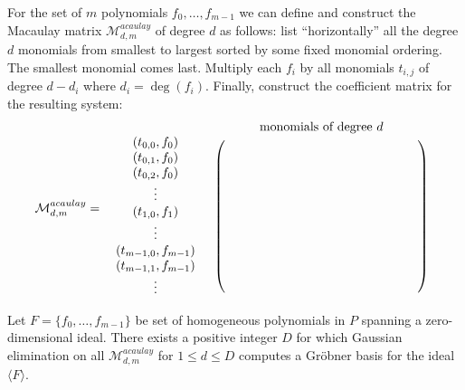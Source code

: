 \documentclass{llncs}
\newcommand{\ideal}[1]{\ensuremath{\langle #1 \rangle}\xspace}
\newcommand{\Mac}[1]{\ensuremath{\mathcal{M}^{acaulay}_{#1}}}
\begin{document}
\begin{definition}
For the set of $m$ polynomials $f_0,\dots, f_{m-1}$ we can define and construct the Macaulay matrix $\Mac{d,m}$ of degree $d$ as follows: list ``horizontally'' all the degree $d$ monomials from smallest to largest sorted by some fixed monomial ordering. The smallest monomial comes last. Multiply each $f_i$ by all monomials $t_{i,j}$ of degree $d-d_i$ where $d_i = \deg(f_i)$. Finally, construct the coefficient matrix for the resulting system:
\begin{align*}
\Mac{d,m} = \begin{array}{cc}
 & \textnormal{monomials of degree } d\\
\begin{array}{c}(t_{0,0},f_0)\\
(t_{0,1},f_0)\\
(t_{0,2},f_0)\\
\vdots\\
(t_{1,0},f_1)\\
\vdots\\
(t_{m-1,0},f_{m-1})\\
(t_{m-1,1},f_{m-1})\\
\vdots\\
\end{array} &
\left(\begin{array}{c} \\
\hspace{5cm}\\
\\
\\
\\
\\
\\
\\
\\
\\
\end{array}\right)
\end{array}
\end{align*}
\end{definition}

\begin{theorem}
\label{theorem:lazard} Let $F=\{f_0,\dots,f_{m-1}\}$ be set of homogeneous polynomials in $P$ spanning a zero-dimensional ideal. There exists a positive integer $D$ for which Gaussian elimination on all $\Mac{d,m}$ for $1 \leq d \leq D$ computes a Gr\"{o}bner basis for the ideal $\ideal{F}$.
\end{theorem}
\end{document}
